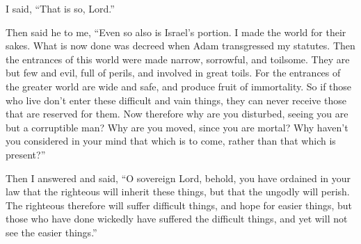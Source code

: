  I said, ``That is so, Lord.''

Then said he to me, ``Even so also is Israel's portion.  I
made the world for their sakes. What is now done was decreed when Adam
transgressed my statutes.  Then the entrances of this world
were made narrow, sorrowful, and toilsome. They are but few and evil,
full of perils, and involved in great toils.  For the
entrances of the greater world are wide and safe, and produce fruit of
immortality.  So if those who live don't enter these
difficult and vain things, they can never receive those that are
reserved for them.  Now therefore why are you disturbed,
seeing you are but a corruptible man? Why are you moved, since you are
mortal?  Why haven't you considered in your mind that which
is to come, rather than that which is present?''

 Then I answered and said, ``O sovereign Lord, behold, you
have ordained in your law that the righteous will inherit these things,
but that the ungodly will perish.  The righteous therefore
will suffer difficult things, and hope for easier things, but those who
have done wickedly have suffered the difficult things, and yet will not
see the easier things.''

